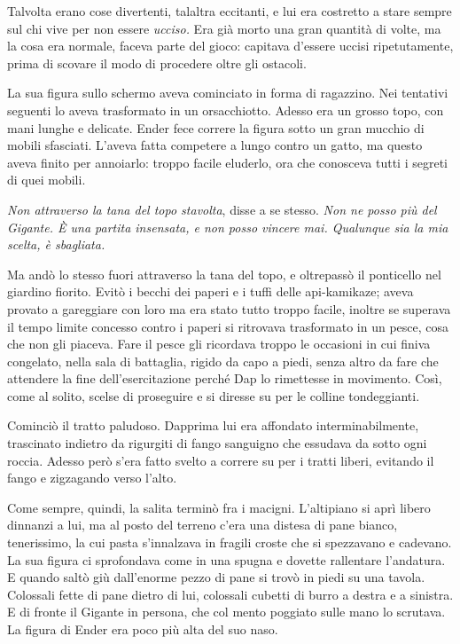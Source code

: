 {Talvolta erano cose divertenti, talaltra eccitanti, e lui era costretto
	a stare sempre sul chi vive per non essere \emph{ucciso.} Era già morto
	una gran quantità di volte, ma la cosa era normale, faceva parte del
	gioco: capitava d'essere uccisi ripetutamente, prima di scovare il modo
	di procedere oltre gli ostacoli.}

{La sua figura sullo schermo aveva cominciato in forma di ragazzino. Nei
	tentativi seguenti lo aveva trasformato in un orsacchiotto. Adesso era
	un grosso topo, con mani lunghe e delicate. Ender fece correre la figura
	sotto un gran mucchio di mobili sfasciati. L'aveva fatta competere a
	lungo contro un gatto, ma questo aveva finito per annoiarlo: troppo
	facile eluderlo, ora che conosceva tutti i segreti di quei mobili.}

\emph{{Non attraverso la tana del topo stavolta}}{, \emph{} disse a se
	stesso. \emph{Non ne posso più del Gigante. È una partita insensata, e
		non posso vincere mai. Qualunque sia la mia scelta, è sbagliata.}}

{Ma andò lo stesso fuori attraverso la tana del topo, e oltrepassò il
	ponticello nel giardino fiorito. Evitò i becchi dei paperi e i tuffi
	delle api-kamikaze; aveva provato a gareggiare con loro ma era stato
	tutto troppo facile, inoltre se superava il tempo limite concesso contro
	i paperi si ritrovava trasformato in un pesce, cosa che non gli piaceva.
	Fare il pesce gli ricordava troppo le occasioni in cui finiva congelato,
	nella sala di battaglia, rigido da capo a piedi, senza altro da fare che
	attendere la fine dell'esercitazione perché Dap lo rimettesse in
	movimento. Così, come al solito, scelse di proseguire e si diresse su
	per le colline tondeggianti.}

{Cominciò il tratto paludoso. Dapprima lui era affondato
	interminabilmente, trascinato indietro da rigurgiti di fango sanguigno
	che essudava da sotto ogni roccia. Adesso però s'era fatto svelto a
	correre su per i tratti liberi, evitando il fango e zigzagando verso
	l'alto.}

{Come sempre, quindi, la salita terminò fra i macigni. L'altipiano si
	aprì libero dinnanzi a lui, ma al posto del terreno c'era una distesa di
	pane bianco, tenerissimo, la cui pasta s'innalzava in fragili croste che
	si spezzavano e cadevano. La sua figura ci sprofondava come in una
	spugna e dovette rallentare l'andatura. E quando saltò giù dall'enorme
	pezzo di pane si trovò in piedi su una tavola. Colossali fette di pane
	dietro di lui, colossali cubetti di burro a destra e a sinistra. E di
	fronte il Gigante in persona, che col mento poggiato sulle mano lo
	scrutava. La figura di Ender era poco più alta del suo naso.}

